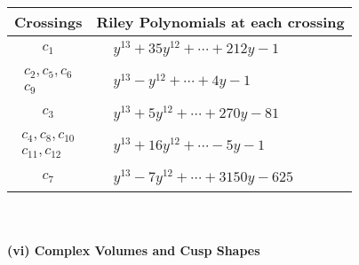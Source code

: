 \documentclass[1p]{elsarticle_modified}
\theoremstyle{definition}
\begin{document}
\begin{tabular}{m{50pt}|m{274pt}}
Crossings & \hspace{64pt}Riley Polynomials at each crossing \\
\hline $$\begin{aligned}c_{1}\end{aligned}$$&$\begin{aligned}
&y^{13}+35 y^{12}+\cdots+212 y-1
\end{aligned}$\\
\hline $$\begin{aligned}c_{2},c_{5},c_{6}\\c_{9}\end{aligned}$$&$\begin{aligned}
&y^{13}- y^{12}+\cdots+4 y-1
\end{aligned}$\\
\hline $$\begin{aligned}c_{3}\end{aligned}$$&$\begin{aligned}
&y^{13}+5 y^{12}+\cdots+270 y-81
\end{aligned}$\\
\hline $$\begin{aligned}c_{4},c_{8},c_{10}\\c_{11},c_{12}\end{aligned}$$&$\begin{aligned}
&y^{13}+16 y^{12}+\cdots-5 y-1
\end{aligned}$\\
\hline $$\begin{aligned}c_{7}\end{aligned}$$&$\begin{aligned}
&y^{13}-7 y^{12}+\cdots+3150 y-625
\end{aligned}$\\
\hline
\end{tabular}\\~\\
\newpage\flushleft \textbf{(vi) Complex Volumes and Cusp Shapes}
\end{document}
